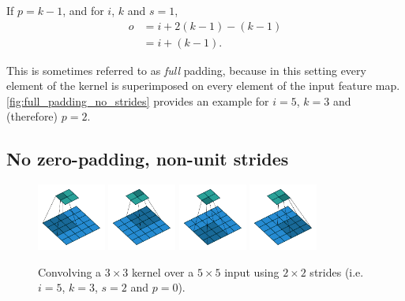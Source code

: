 \documentclass{article}
\begin{document}
\begin{prop}\label{prop:full_padding_no_strides}
If $p = k - 1$, and for $i$, $k$ and $s = 1$,
\begin{equation*}
\begin{split}
    o &= i + 2(k - 1) - (k - 1) \\
      &= i + (k - 1).
\end{split}
\end{equation*}
\end{prop}

This is sometimes referred to as {\em full} padding, because in this setting
every element of the kernel is superimposed on every element of the input
feature map. \autoref{fig:full_padding_no_strides} provides an example for $i =
5$, $k = 3$ and (therefore) $p = 2$.

\subsection{No zero-padding, non-unit strides}

\begin{figure}[h]
    \centering
    \includegraphics[width=0.2\textwidth]{pdf/no_padding_strides_00.pdf}
    \includegraphics[width=0.2\textwidth]{pdf/no_padding_strides_01.pdf}
    \includegraphics[width=0.2\textwidth]{pdf/no_padding_strides_02.pdf}
    \includegraphics[width=0.2\textwidth]{pdf/no_padding_strides_03.pdf}
    \caption{\label{fig:no_padding_strides} Convolving a $3 \times 3$
        kernel over a $5 \times 5$ input using $2 \times 2$ strides (i.e.
        $i = 5$, $k = 3$, $s = 2$ and $p = 0$).}
\end{figure}
\end{document}
